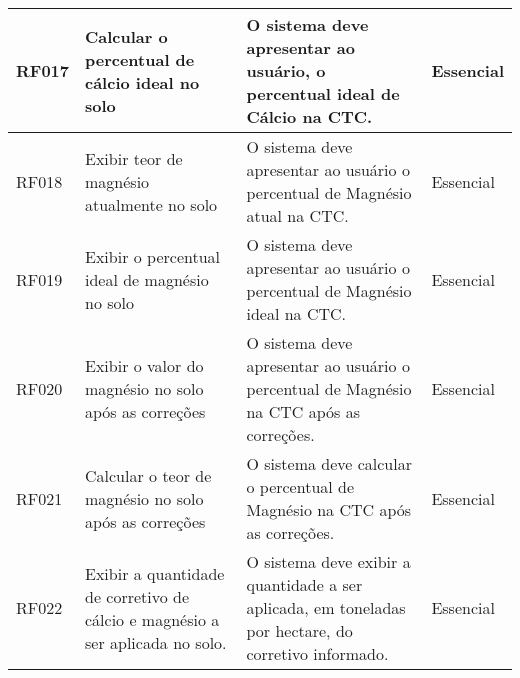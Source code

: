 \begin{landscape}
\begin{longtable}{|p{1.5cm}|p{5cm}|p{9cm}|p{2.5cm}|}
    RF017 & Calcular o percentual de cálcio ideal no solo                                    & O sistema deve apresentar ao usuário, o percentual ideal de Cálcio na CTC.                                                                                                                                                                                                                              & Essencial  \\\hline
    RF018 & Exibir teor de magnésio atualmente no solo                                       & O sistema deve apresentar ao usuário o percentual de Magnésio atual na CTC.                                                                                                                                                                                                                             & Essencial  \\\hline
    RF019 & Exibir o percentual ideal de magnésio no solo                                    & O sistema deve apresentar ao usuário o percentual de Magnésio ideal na CTC.                                                                                                                                                                                                                             & Essencial  \\\hline
    RF020 & Exibir o valor do magnésio no solo após as correções                             & O sistema deve apresentar ao usuário o percentual de Magnésio na CTC após as correções.                                                                                                                                                                                                                 & Essencial  \\\hline
    RF021 & Calcular o teor de magnésio no solo após as correções                            & O sistema deve calcular o percentual de Magnésio na CTC após as correções.                                                                                                                                                                                                                              & Essencial  \\\hline
    RF022 & Exibir a quantidade de corretivo de cálcio e magnésio a ser aplicada no solo.    & O sistema deve exibir a quantidade a ser aplicada, em toneladas por hectare, do corretivo informado.                                                                                                                                                                                                    & Essencial  \\\hline

\end{longtable}
\end{landscape}
